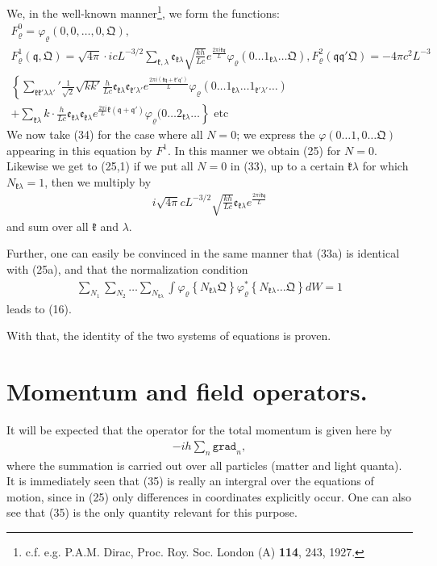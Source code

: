 \documentclass[a4paper,11pt]{article}
\newcommand{\?}[2]{#1\footnote{\textsc{Translator note}: #2}}
\newcommand{\nequ}[2]{\begin{align*}\tag{#1}#2\end{align*}}
\newcommand{\uequ}[1]{\begin{align*}#1\end{align*}}
\renewcommand{\operatorfont}[1]{\texttt{#1}}
\newcommand{\grad}{\operatorfont{grad}}
\renewcommand{\exp}[1]{e^{#1}}
\newcommand{\mf}[1]{\mathfrak{#1}}
\begin{document}
We, in the well-known manner\footnote{c.f. e.g. P.A.M. Dirac, Proc. Roy. Soc. London (A) \textbf{114}, 243, 1927.}, we form the functions:
\uequ{
F_\varrho^0 = \varphi_\varrho(0,0,\dots,0,\mf{Q}),\\
F_\varrho^1(\mf{q},\mf{Q}) = \sqrt{4\pi}\cdot icL^{-3/2}
\sum\limits_{\mf{k},\lambda}\mf{e}_{\mf{k}\lambda}
\sqrt{\frac{kh}{Lc}}\exp{\frac{2\pi i\mf{kq}}{L}}
\varphi_\varrho(0\dots 1_{\mf{k}\lambda} \dots \mf{Q}),
F_\varrho^2(\mf{q}\mf{q}'\mf{Q}) = -4\pi c^2 L^{-3}\\
\left\{{\sum\limits_{\mf{k}\mf{k}'\lambda\lambda'}}'
\frac{1}{\sqrt{2}}\sqrt{kk'}\frac{h}{Lc}
\mf{e}_{\mf{k}\lambda}\mf{e}_{\mf{k}'\lambda'}
\exp{\frac{2\pi i(\mf{kq} + \mf{k}'\mf{q}')}{L}}
\varphi_\varrho(0\dots 1_{\mf{k}\lambda} \dots 1_{\mf{k}'\lambda'}\dots)\right.\\ \left.
+ \sum\limits_{\mf{k}\lambda}k\cdot \frac{h}{Lc}
\mf{e}_{\mf{k}\lambda}\mf{e}_{\mf{k}\lambda}
\exp{\frac{2\pi i}{L}\mf{k}(\mf{q} + \mf{q}')}
\varphi_\varrho(0\dots 2_{\mf{k}\lambda} \dots
\right\} \text{ etc }
}
We now take (34) for the case where all $N=0$; we express the $\varphi(0\dots 1, 0\dots \mf{Q})$ appearing in this equation by $F^1$. In this manner we obtain (25) for $N=0$. Likewise we get to (25,1) if we put all $N=0$ in (33), up to a certain $\mf{k}\lambda$ for which $N_{\mf{k}\lambda} = 1$, then we multiply by
\uequ{
i\sqrt{4\pi}c L^{-3/2} \sqrt{\frac{kh}{Lc}}\mf{e}_{\mf{k}\lambda}
\exp{\frac{2\pi i\mf{kq}}{L}}
}
and sum over all $\mf{k}$ and $\lambda$.

Further, one can easily be convinced in the same manner that (33a) is identical with (25a), and that the normalization condition
\uequ{
\sum\limits_{N_1}\sum\limits_{N_2}\dots\sum\limits_{N_{\mf{k}\lambda}}\int
\varphi_\varrho\left\{N_{\mf{k}\lambda}\mf{Q}\right\}
\varphi^*_\varrho\left\{N_{\mf{k}\lambda}\dots\mf{Q}\right\}
dW = 1
}
leads to (16).

With that, the identity of the two systems of equations is proven.

\section{Momentum and field operators.} It will be expected that the operator for the total momentum is given here by
\nequ{35}{
-ih\sum\limits_n\grad_n,
}
where the summation is carried out over all particles (matter and light quanta). It is immediately seen that (35) is really an intergral over the equations of motion, since in (25) only differences in coordinates explicitly occur. One can also see that (35) is the only quantity relevant for this purpose.
\end{document}
